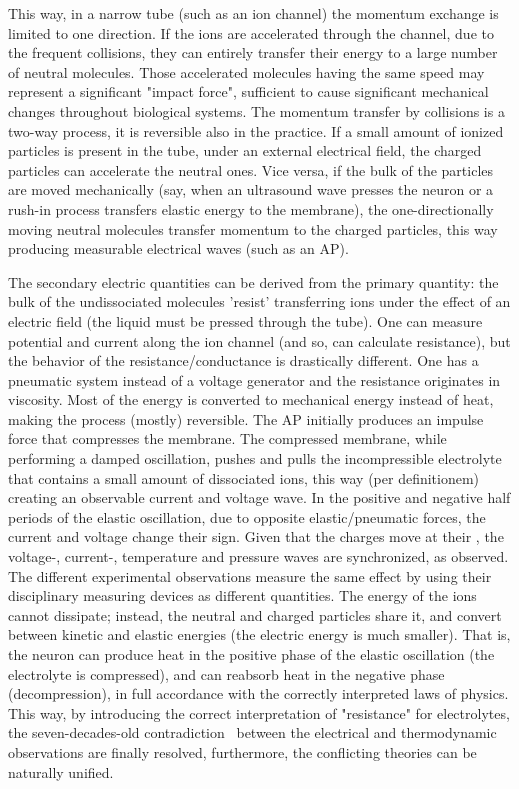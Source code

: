 This way, in a narrow tube (such as an ion channel) the momentum exchange
is limited to one direction.
If the ions are accelerated through the channel, due  to the
frequent collisions, they can entirely transfer their 
energy to a large number of neutral molecules. 
Those accelerated molecules having the same speed
may represent a significant "impact force", sufficient
to cause significant mechanical changes throughout
biological systems.
The momentum transfer by collisions
is a two-way process, it is reversible also in the practice. If a small amount of ionized
particles is present in the tube, under an external electrical
field, the charged particles can accelerate the neutral ones.
Vice versa, if the bulk of the particles are moved mechanically (say, when an ultrasound wave
 presses the neuron or a rush-in process transfers elastic energy to the membrane), the one-directionally moving
 neutral molecules transfer momentum to the charged particles,
 this way producing measurable electrical waves (such as an \gls{AP}).


The secondary electric quantities can be derived from
the primary quantity: the bulk of the undissociated molecules
'resist' transferring ions under the effect of an electric field (the liquid must be pressed through the tube).
One can measure potential and current along the ion
channel (and so, can calculate resistance), but the behavior of the resistance/conductance is 
drastically different. One has a pneumatic system instead of a voltage generator and the resistance originates in viscosity. Most of the energy is converted to
mechanical energy instead of heat, making the process (mostly) reversible.
The \gls{AP} initially produces an impulse force that compresses the membrane. The compressed membrane, while performing a damped oscillation, pushes and pulls the incompressible electrolyte that contains a small amount of dissociated ions, this way (per definitionem)
creating an observable current and voltage wave. In the 
positive and negative half periods of the elastic oscillation,
due to opposite elastic/pneumatic forces, the current and voltage  change their sign. Given that the charges move at their
, the voltage-, current-, temperature and pressure waves are synchronized, as observed. The different 
experimental observations measure the same effect
by using their disciplinary measuring devices as different quantities.
The energy of the ions cannot dissipate; instead, the neutral and charged 
particles share it, and convert between kinetic and elastic energies (the electric energy is much smaller).
That is, the 
neuron can produce heat in the positive phase of the
elastic oscillation (the electrolyte is compressed),
and can reabsorb heat in the negative phase (decompression), in full accordance with the correctly interpreted laws of physics.
This way, by introducing the correct interpretation of "resistance" for electrolytes, the seven-decades-old
contradiction~\cite{HeatProductionNeuron:1958}
between the electrical and thermodynamic observations
are finally resolved, furthermore, the conflicting theories
can be naturally unified.



